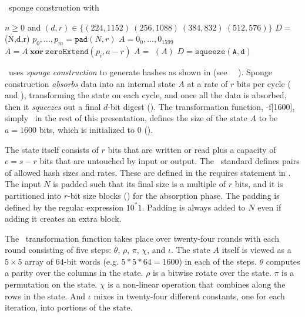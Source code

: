 \begin{algorithm}[t]
  \caption{\shaThree\ sponge construction with \keccak}\label{alg:sha3}
  \begin{algorithmic}[1]
    \Require $n \geq 0$ and $(d,r) \in \{(224, 1152)\ (256, 1088)\ (384, 832)\ (512, 576)\}$
    \Ensure $D =$ \shaThree(N,d,r)
    \State $p_0, \ldots, p_m = \mathtt{pad}(N, r)$\label{line:pad}
    \State $A = 0_0, \ldots, 0_{1599}$\label{line:init}
      \State $A = A\ \mathbf{xor}\ \mathtt{zeroExtend}(p_i, a-r)$\label{line:absorb}
      \State $A =$ \keccak$(A)$\label{line:keccak}
    \EndFor
    \State $D = \mathtt{squeeze(A,d)}$\label{line:squeeze}
  \end{algorithmic}
\end{algorithm}

\shaThree\ uses \emph{sponge construction} to generate hashes as shown in  (see \nist\ \fips\ \cite{fips202}).
Sponge construction \emph{absorbs} data into an internal state $A$ at a rate of $r$ bits per cycle ( and ), transforming the state on each cycle, and once all the data is absorbed, then it \emph{squeezes} out a final $d$-bit digest ().
The transformation function, \keccak-f[1600], simply \keccak\ in the rest of this presentation, defines the size of the state $A$ to be $a = 1600$ bits, which is initialized to 0 ().

The state itself consists of $r$ bits that are written or read plus a capacity of $c = s - r$ bits that are untouched by input or output.
The \nist\ standard defines pairs of allowed hash sizes and rates.
These are defined in the requires statement in . 
The input $N$ is padded such that its final size is a multiple of $r$ bits, and it is partitioned into $r$-bit size blocks () for the absorption phase.
The padding is defined by the regular expression $10^*1$.
Padding is always added to $N$ even if adding it creates an extra block.

The \keccak\ transformation function takes place over twenty-four rounds with each round consisting of five steps: $\theta$, $\rho$, $\pi$, $\chi$, and $\iota$.
The state $A$ itself is viewed as a $5 \times 5$ array of $64$-bit words (e.g. $5 * 5 * 64 = 1600$) in each of the steps.
$\theta$ computes a parity over the columns in the state. $\rho$ is a bitwise rotate over the state.
$\pi$ is a permutation on the state. $\chi$ is a non-linear operation that combines along the rows in the state.
And $\iota$ mixes in twenty-four different constants, one for each iteration, into portions of the state.
